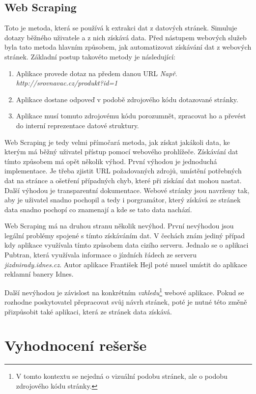 \subsection{Web Scraping}
\label{sec:screenscraping}
Toto je metoda, která se používá k extrakci dat z datových stránek. Simuluje dotazy běžného uživatele a z nich získává data. Před nástupem webových služeb byla tato metoda hlavním způsobem, jak automatizovat získávání dat z webových stránek\cite{oreilly2007web}. Základní postup takovéto metody je následující:

\begin{enumerate}
\item Aplikace provede dotaz na předem danou URL \emph{Např. http://srovnavac.cz/produkt?id=1}
\item Aplikace dostane odpoveď v podobě zdrojového kódu dotazované stránky.
\item Aplikace musí tomuto zdrojovému kódu porozumnět, zpracovat ho a převést do interní reprezentace datové struktury.
\end{enumerate}

Web Scraping je tedy velmi přímočará metoda, jak získat jakákoli data, ke kterým má běžný uživatel přístup pomocí webového prohlížeče. Získávání dat tímto způsobem má opět několik výhod. První výhodou je jednoduchá implementace. Je třeba zjistit URL požadovaných zdrojů, umístění potřebných dat na stránce a ošetření případných chyb, které při získání dat mohou nastat. Další výhodou je transparentní dokumentace. Webové stránky jsou navrženy tak, aby je uživatel snadno pochopil a tedy i porgramátor, který získává ze stránek data snadno pochopí co znamenají a kde se tato data nachází.

Web Scraping má na druhou stranu několik nevýhod. První nevýhodou jsou legální problémy spojené s tímto získáváním dat. V čechách znám jediný případ kdy aplikace využívala tímto způsobem data cizího serveru. Jednalo se o aplikaci Pubtran, která využívala informace o jízdních řádech ze serveru \emph{jizdnirady.idnes.cz}. Autor aplikace František Hejl poté musel umístit do aplikace reklamní banery Idnes.

Další nevýhodou je závislost na konkrétním \emph{vzhledu}\footnote{V tomto kontextu se nejedná o vizuální podobu stránek, ale o podobu zdrojového kódu stránky.} webové aplikace. Pokud se rozhodne poskytovatel přepracovat svůj návrh stránek, poté je nutné této změně přizpůsobit také aplikaci, která ze stránek data získává.

\section{Vyhodnocení rešerše}